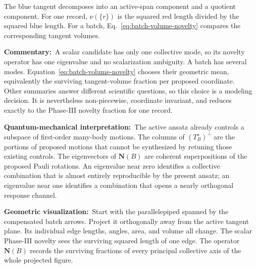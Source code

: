 \documentclass[10pt,twocolumn]{article}
\newcommand{\commentary}[1]{\par\noindent\textbf{Commentary:}\ #1\par}
\newcommand{\phys}[1]{\par\noindent\textbf{Quantum-mechanical interpretation:}\ #1\par}
\newcommand{\geom}[1]{\par\noindent\textbf{Geometric visualization:}\ \textcolor{teal!70!black}{#1}\par}
\begin{document}
\begin{center}
\end{center}
The blue tangent decomposes into an active-span component and a quotient
component. For one record, \(\nu(\{r\})\) is the squared red length divided by
the squared blue length. For a batch, Eq.~\eqref{eq:batch-volume-novelty}
compares the corresponding tangent volumes.

\commentary{A scalar candidate has only one collective mode, so its novelty
operator has one eigenvalue and no scalarization ambiguity. A batch has several
modes. Equation~\eqref{eq:batch-volume-novelty} chooses their geometric mean,
equivalently the surviving tangent-volume fraction per proposed coordinate.
Other summaries answer different scientific questions, so this choice is a
modeling decision. It is nevertheless non-piecewise, coordinate invariant, and
reduces exactly to the Phase-III novelty fraction for one record.}

\phys{The active ansatz already controls a subspace of first-order many-body
motions. The columns of \((T_B^\star)^\perp\) are the portions of proposed
motions that cannot be synthesized by retuning those existing controls. The
eigenvectors of \(\mathbf N(B)\) are coherent superpositions of the proposed
Pauli rotations. An eigenvalue near zero identifies a collective combination
that is almost entirely reproducible by the present ansatz; an eigenvalue near
one identifies a combination that opens a nearly orthogonal response channel.}

\geom{Start with the parallelepiped spanned by the compensated batch arrows.
Project it orthogonally away from the active tangent plane. Its individual edge
lengths, angles, area, and volume all change. The scalar Phase-III novelty sees
the surviving squared length of one edge. The operator \(\mathbf N(B)\) records
the surviving fractions of every principal collective axis of the whole
projected figure.}
\end{document}
